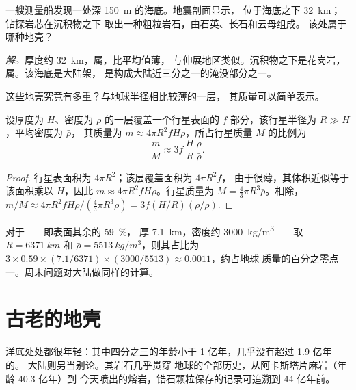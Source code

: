 \begin{example}[浅海海底]\label{ex:g12:continental-crust:shelf}
一艘测量船发现一处深 \qty{150}{m} 的海底。地震剖面显示，
位于海底之下 \qty{32}{km}；钻探岩芯在沉积物之下
取出一种粗粒岩石，由石英、长石和云母组成。
该处属于哪种地壳？

\emph{解。}厚度约 \qty{32}{km}，属，比平均值薄，
与伸展地区类似。沉积物之下是花岗岩，
属。该海底是大陆架，
是构成大陆近三分之一的淹没部分之一。
\end{example}

这些地壳究竟有多重？与地球半径相比较薄的一层，
其质量可以简单表示。

\begin{proposition}[薄层的质量]\label{prop:g12:continental-crust:thin-layer}
设厚度为 $H$、密度为 $\rho$ 的一层覆盖一个行星表面的
$f$ 部分，该行星半径为 $R \gg H$，平均密度为 $\bar\rho$，
其质量为 $m \approx 4\pi R^2 f H \rho$，所占行星质量 $M$ 的比例为
\[
  \frac{m}{M} \approx 3 f\,\frac{H}{R}\,\frac{\rho}{\bar\rho}.
\]
\end{proposition}

\begin{proof}
行星表面积为 $4\pi R^2$；该层覆盖面积为 $4\pi R^2 f$，
由于很薄，其体积近似等于该面积乘以 $H$，因此 $m \approx 4\pi R^2
f H \rho$。行星质量为 $M = \tfrac{4}{3}\pi R^3 \bar\rho$。相除，
$m/M \approx 4\pi R^2 f H \rho / (\tfrac{4}{3}\pi R^3 \bar\rho) = 3 f (H/R)
(\rho/\bar\rho)$.
\end{proof}

对于——即表面其余的 \qty{59}{\percent}，
厚 \qty{7.1}{km}，密度约 \qty{3000}{kg/m^3}——取 $R = \qty{6371}{km}$ 和
$\bar\rho = \qty{5513}{kg/m^3}$，则其占比为 $3 \times 0.59 \times
(7.1/6371) \times (3000/5513) \approx 0.0011$，约占地球
质量的百分之零点一。周末问题对大陆做同样的计算。

\section{古老的地壳}

洋底处处都很年轻：其中四分之三的年龄小于
1 亿年，几乎没有超过 1.9 亿年的。
大陆则另当别论。其岩石几乎贯穿
地球的全部历史，从阿卡斯塔片麻岩（年龄 40.3 亿年）到
今天喷出的熔岩，锆石颗粒保存的记录可追溯到 44 亿年前。

